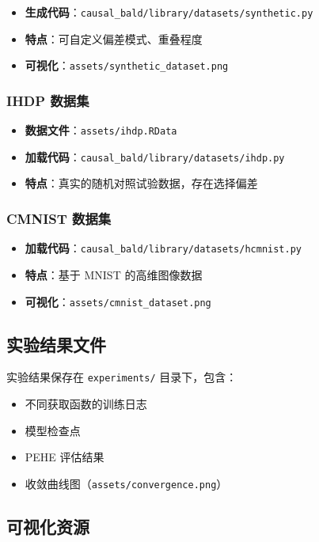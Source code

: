 \documentclass[12pt]{article}
\begin{document}
\begin{itemize}
\item \textbf{生成代码}：\texttt{causal\_bald/library/datasets/synthetic.py}
\item \textbf{特点}：可自定义偏差模式、重叠程度
\item \textbf{可视化}：\texttt{assets/synthetic\_dataset.png}
\end{itemize}

\subsubsection{IHDP 数据集}

\begin{itemize}
\item \textbf{数据文件}：\texttt{assets/ihdp.RData}
\item \textbf{加载代码}：\texttt{causal\_bald/library/datasets/ihdp.py}
\item \textbf{特点}：真实的随机对照试验数据，存在选择偏差
\end{itemize}

\subsubsection{CMNIST 数据集}

\begin{itemize}
\item \textbf{加载代码}：\texttt{causal\_bald/library/datasets/hcmnist.py}
\item \textbf{特点}：基于 MNIST 的高维图像数据
\item \textbf{可视化}：\texttt{assets/cmnist\_dataset.png}
\end{itemize}

\subsection{实验结果文件}

实验结果保存在 \texttt{experiments/} 目录下，包含：
\begin{itemize}
\item 不同获取函数的训练日志
\item 模型检查点
\item PEHE 评估结果
\item 收敛曲线图（\texttt{assets/convergence.png}）
\end{itemize}

\subsection{可视化资源}
\end{document}
